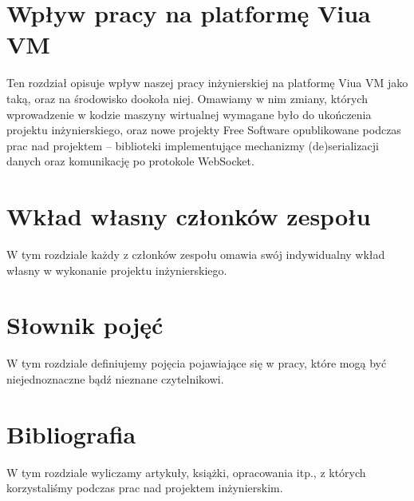 \documentclass[11pt,oneside,a4paper,titlepage,onecolumn]{book}
\begin{document}

\section{Wpływ pracy na platformę Viua VM}

Ten rozdział opisuje wpływ naszej pracy inżynierskiej na platformę Viua VM jako taką, oraz na środowisko
dookoła niej. Omawiamy w nim zmiany, których wprowadzenie w kodzie maszyny wirtualnej wymagane było do
ukończenia projektu inżynierskiego, oraz nowe projekty Free Software opublikowane podczas prac nad projektem
-- biblioteki implementujące mechanizmy (de)serializacji danych oraz komunikację po protokole WebSocket.


\section{Wkład własny członków zespołu}

W tym rozdziale każdy z członków zespołu omawia swój indywidualny wkład własny w wykonanie projektu
inżynierskiego.

\section{Słownik pojęć}

W tym rozdziale definiujemy pojęcia pojawiające się w pracy, które mogą być niejednoznaczne bądź nieznane
czytelnikowi.

\section{Bibliografia}

W tym rozdziale wyliczamy artykuły, książki, opracowania itp., z których korzystaliśmy podczas prac nad
projektem inżynierskim.
\end{document}
